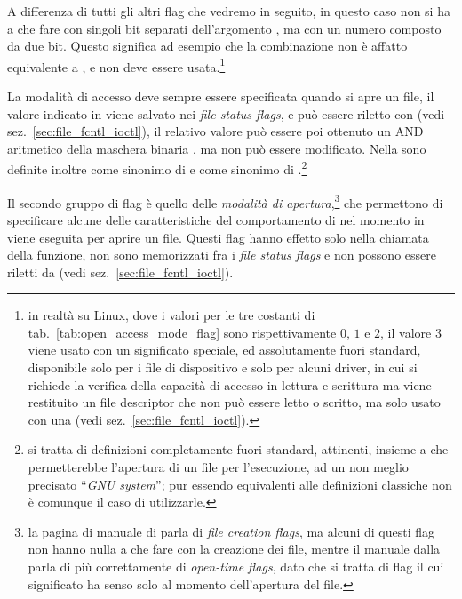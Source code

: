 A differenza di tutti gli altri flag che vedremo in seguito, in questo caso
non si ha a che fare con singoli bit separati dell'argomento , ma
con un numero composto da due bit. Questo significa ad esempio che la
combinazione  non è affatto
equivalente a , e non deve essere usata.\footnote{in realtà
  su Linux, dove i valori per le tre costanti di
  tab.~\ref{tab:open_access_mode_flag} sono rispettivamente $0$, $1$ e $2$, il
  valore $3$ viene usato con un significato speciale, ed assolutamente fuori
  standard, disponibile solo per i file di dispositivo e solo per alcuni
  driver, in cui si richiede la verifica della capacità di accesso in lettura
  e scrittura ma viene restituito un file descriptor che non può essere letto
  o scritto, ma solo usato con una  (vedi
  sez.~\ref{sec:file_fcntl_ioctl}).}

La modalità di accesso deve sempre essere specificata quando si apre un file,
il valore indicato in  viene salvato nei \textit{file status
  flags}, e può essere riletto con  (vedi
sez.~\ref{sec:file_fcntl_ioctl}), il relativo valore può essere poi ottenuto
un AND aritmetico della maschera binaria , ma non può essere
modificato. Nella  sono definite inoltre  come
sinonimo di  e  come sinonimo di
.\footnote{si tratta di definizioni completamente fuori
  standard, attinenti, insieme a  che permetterebbe l'apertura
  di un file per l'esecuzione, ad un non meglio precisato ``\textit{GNU
    system}''; pur essendo equivalenti alle definizioni classiche non è
  comunque il caso di utilizzarle.}


Il secondo gruppo di flag è quello delle \textsl{modalità di
  apertura},\footnote{la pagina di manuale di  parla di
  \textit{file creation flags}, ma alcuni di questi flag non hanno nulla a che
  fare con la creazione dei file, mentre il manuale dalla  parla di
  più correttamente di \textit{open-time flags}, dato che si tratta di flag il
  cui significato ha senso solo al momento dell'apertura del file.} che
permettono di specificare alcune delle caratteristiche del comportamento di
 nel momento in viene eseguita per aprire un file. Questi flag
hanno effetto solo nella chiamata della funzione, non sono memorizzati fra i
\textit{file status flags} e non possono essere riletti da  (vedi
sez.~\ref{sec:file_fcntl_ioctl}).

